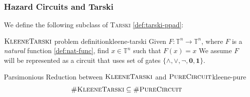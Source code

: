 %
%
%

\subsubsection{Hazard Circuits and Tarski}
We define the following subclass of \textsc{Tarski} \ref{def:tarski-ppad}:


\begin{definitionbox}{$\textnormal{\textsc{KleeneTarski}}$ problem definition}{kleene-tarski}
    Given $F: \mathbb{T}^n \to \mathbb{T}^n$, where $F$ is a \textit{natural} function \ref{def:nat-func},
    find $x \in \mathbb{T}^n$ such that $F(x) = x$
    We assume $F$ will be represented as a circuit that uses set of gates
    $\{\wedge, \vee, \neg, \mathbf{0}, \mathbf{1}\}$.
\end{definitionbox}

\begin{propositionbox}{Parsimonious Reduction between $\textnormal{\textsc{KleeneTarski}}$ and $\textnormal{\textsc{PureCircuit}}$}{kleene-pure}
    $$
    \textnormal{\textsc{\#KleeneTarski}} \subseteq \textnormal{\textsc{\#PureCircuit}}
    $$
\end{propositionbox}

